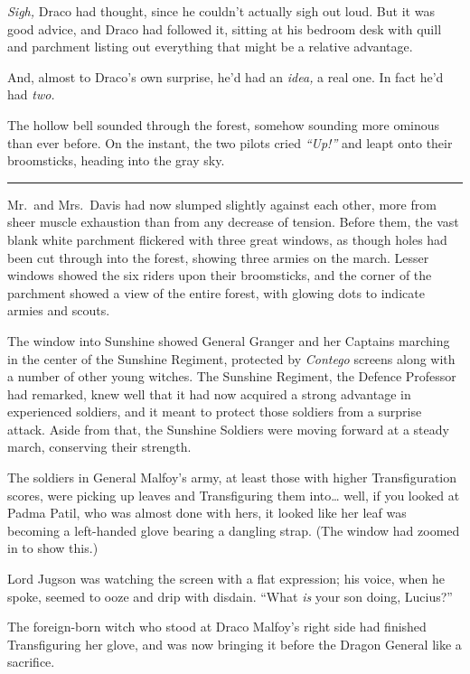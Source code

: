 \emph{Sigh,} Draco had thought, since he couldn't actually sigh out
loud. But it was good advice, and Draco had followed it, sitting at his
bedroom desk with quill and parchment listing out everything that might
be a relative advantage.

And, almost to Draco's own surprise, he'd had an \emph{idea,} a real
one. In fact he'd had \emph{two.}

The hollow bell sounded through the forest, somehow sounding more
ominous than ever before. On the instant, the two pilots cried
\emph{``Up!''} and leapt onto their broomsticks, heading into the gray
sky.

\begin{center}\rule{3in}{0.4pt}\end{center}

Mr.~and Mrs.~Davis had now slumped slightly against each other, more
from sheer muscle exhaustion than from any decrease of tension. Before
them, the vast blank white parchment flickered with three great windows,
as though holes had been cut through into the forest, showing three
armies on the march. Lesser windows showed the six riders upon their
broomsticks, and the corner of the parchment showed a view of the entire
forest, with glowing dots to indicate armies and scouts.

The window into Sunshine showed General Granger and her Captains
marching in the center of the Sunshine Regiment, protected by
\emph{Contego} screens along with a number of other young witches. The
Sunshine Regiment, the Defence Professor had remarked, knew well that it
had now acquired a strong advantage in experienced soldiers, and it
meant to protect those soldiers from a surprise attack. Aside from that,
the Sunshine Soldiers were moving forward at a steady march, conserving
their strength.

The soldiers in General Malfoy's army, at least those with higher
Transfiguration scores, were picking up leaves and Transfiguring them
into\ldots{} well, if you looked at Padma Patil, who was almost done
with hers, it looked like her leaf was becoming a left-handed glove
bearing a dangling strap. (The window had zoomed in to show this.)

Lord Jugson was watching the screen with a flat expression; his voice,
when he spoke, seemed to ooze and drip with disdain. ``What \emph{is}
your son doing, Lucius?''

The foreign-born witch who stood at Draco Malfoy's right side had
finished Transfiguring her glove, and was now bringing it before the
Dragon General like a sacrifice.

